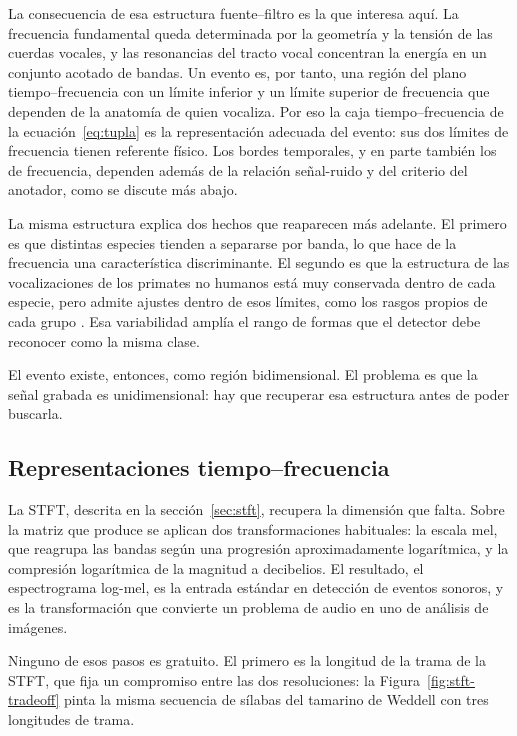 La consecuencia de esa estructura fuente--filtro es la que interesa aquí. La
frecuencia fundamental queda determinada por la geometría y la tensión de las
cuerdas vocales, y las resonancias del tracto vocal concentran la energía en un
conjunto acotado de bandas. Un evento es, por tanto, una región del plano
tiempo--frecuencia con un límite inferior y un límite superior de frecuencia que
dependen de la anatomía de quien vocaliza. Por eso la caja tiempo--frecuencia de la
ecuación~\eqref{eq:tupla} es la representación adecuada del evento: sus dos
límites de frecuencia tienen referente físico. Los bordes temporales, y en parte
también los de frecuencia, dependen además de la relación señal-ruido y del
criterio del anotador, como se discute más abajo.

La misma estructura explica dos hechos que reaparecen más adelante. El primero es
que distintas especies tienden a separarse por banda, lo que hace de la
frecuencia una característica discriminante. El segundo es que la estructura de
las vocalizaciones de los primates no humanos está muy conservada dentro de cada
especie, pero admite ajustes dentro de esos límites, como los rasgos propios de
cada grupo \citep{fischer_towards_2020}. Esa variabilidad amplía el rango de
formas que el detector debe reconocer como la misma clase.

El evento existe, entonces, como región bidimensional. El problema es que la
señal grabada es unidimensional: hay que recuperar esa estructura antes de poder
buscarla.

\subsection{Representaciones tiempo--frecuencia}
\label{sec:frontends}

La STFT, descrita en la sección~\ref{sec:stft}, recupera la dimensión que falta.
Sobre la matriz que produce se aplican dos transformaciones habituales: la escala
mel, que reagrupa las bandas según una progresión aproximadamente logarítmica, y
la compresión logarítmica de la magnitud a decibelios. El resultado, el
espectrograma log-mel, es la entrada estándar en detección de eventos sonoros, y
es la transformación que convierte un problema de audio en uno de análisis de
imágenes.

Ninguno de esos pasos es gratuito. El primero es la longitud de la trama de la
STFT, que fija un compromiso entre las dos resoluciones: la
Figura~\ref{fig:stft-tradeoff} pinta la misma secuencia de sílabas del tamarino
de Weddell con tres longitudes de trama.

